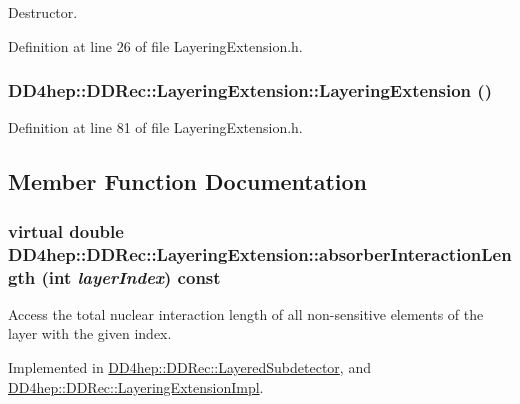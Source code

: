Destructor. 

Definition at line 26 of file LayeringExtension.h.\hypertarget{class_d_d4hep_1_1_d_d_rec_1_1_layering_extension_abea54214401d949b2b3313e0c1d448af}{
\subsubsection[{LayeringExtension}]{\setlength{\rightskip}{0pt plus 5cm}DD4hep::DDRec::LayeringExtension::LayeringExtension ()}}
\label{class_d_d4hep_1_1_d_d_rec_1_1_layering_extension_abea54214401d949b2b3313e0c1d448af}


Definition at line 81 of file LayeringExtension.h.

\subsection{Member Function Documentation}
\hypertarget{class_d_d4hep_1_1_d_d_rec_1_1_layering_extension_af18b1293c0631bd55798e7c73eddeb6b}{
\subsubsection[{absorberInteractionLength}]{\setlength{\rightskip}{0pt plus 5cm}virtual double DD4hep::DDRec::LayeringExtension::absorberInteractionLength (int {\em layerIndex}) const}}
\label{class_d_d4hep_1_1_d_d_rec_1_1_layering_extension_af18b1293c0631bd55798e7c73eddeb6b}


Access the total nuclear interaction length of all non-\/sensitive elements of the layer with the given index. 

Implemented in \hyperlink{class_d_d4hep_1_1_d_d_rec_1_1_layered_subdetector_a89a172816ccb10e28a0f7dd8c150bc89}{DD4hep::DDRec::LayeredSubdetector}, and \hyperlink{class_d_d4hep_1_1_d_d_rec_1_1_layering_extension_impl_ac30e3e0b49ca4f79c5ccd173dcfc669e}{DD4hep::DDRec::LayeringExtensionImpl}.

